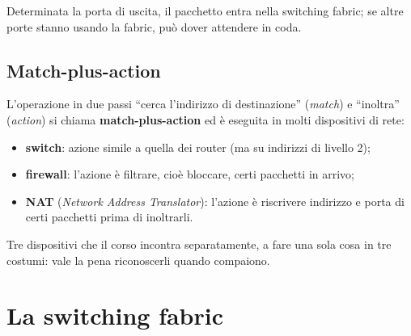 
Determinata la porta di uscita, il pacchetto entra nella switching fabric; se altre porte stanno usando la fabric, può
dover attendere in coda.

\subsection{Match-plus-action}

L'operazione in due passi ``cerca l'indirizzo di destinazione'' (\emph{match}) e ``inoltra'' (\emph{action}) si
chiama \textbf{match-plus-action} ed è eseguita in molti dispositivi di rete:

\begin{itemize}
    \item \textbf{switch}: azione simile a quella dei router (ma su indirizzi di livello 2);
    \item \textbf{firewall}: l'azione è filtrare, cioè bloccare, certi pacchetti in arrivo;
    \item \textbf{NAT} (\emph{Network Address Translator}): l'azione è riscrivere indirizzo e porta di certi pacchetti prima di inoltrarli.
\end{itemize}
Tre dispositivi che il corso incontra separatamente, a fare una sola cosa in tre costumi: vale la pena riconoscerli quando
compaiono.

\section{La switching fabric}

